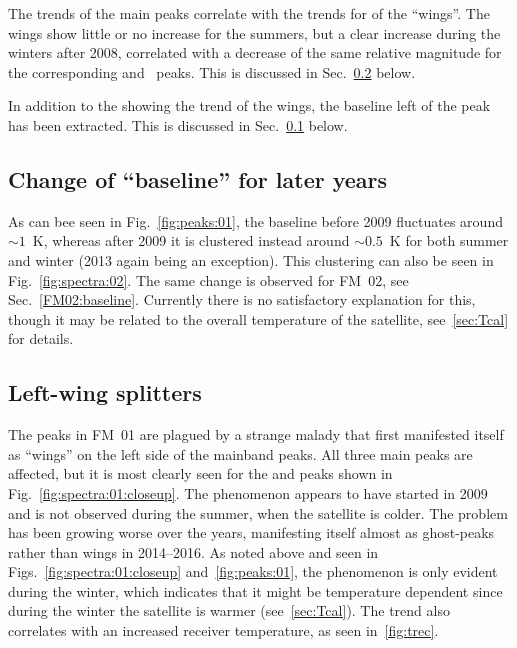 The trends of the main peaks correlate with the trends for of the ``wings''.
The wings show little or no increase for the summers, but a clear increase
during the winters after 2008, correlated with a decrease of the same relative
magnitude for the corresponding  and ~peaks.  This is
discussed in Sec.~\ref{FM01:leftwings} below.

In addition to the showing the trend of the wings, the baseline left of the
 peak has been extracted.  This is discussed in
Sec.~\ref{FM01:baseline} below.


\subsection{Change of ``baseline'' for later years}
\label{FM01:baseline}
As can bee seen in Fig.~\ref{fig:peaks:01}, the baseline before 2009 fluctuates
around $\sim1$~K, whereas after 2009 it is clustered instead around $\sim0.5$~K
for both summer and winter (2013 again being an exception).  This clustering
can also be seen in Fig.~\ref{fig:spectra:02}.  The same change is observed for
FM~02, see Sec.~\ref{FM02:baseline}.  Currently there is no satisfactory
explanation for this, though it may be related to the overall temperature of
the satellite, see~\ref{sec:Tcal} for details.


\subsection{Left-wing splitters}
\label{FM01:leftwings}
The peaks in FM~01 are plagued by a strange malady that first manifested itself
as ``wings'' on the left side of the mainband peaks.  All three main peaks are
affected, but it is most clearly seen for the  and  peaks
shown in Fig.~\ref{fig:spectra:01:closeup}.  The phenomenon appears to have
started in 2009 and is not observed during the summer, when the satellite is
colder.  The problem has been growing worse over the years, manifesting itself
almost as ghost-peaks rather than wings in 2014--2016.  As noted above and seen
in Figs.~\ref{fig:spectra:01:closeup} and~\ref{fig:peaks:01}, the phenomenon is
only evident during the winter, which indicates that it might be temperature
dependent since during the winter the satellite is warmer (see~\ref{sec:Tcal}).
The trend also correlates with an increased receiver temperature, as seen
in~\ref{fig:trec}.

